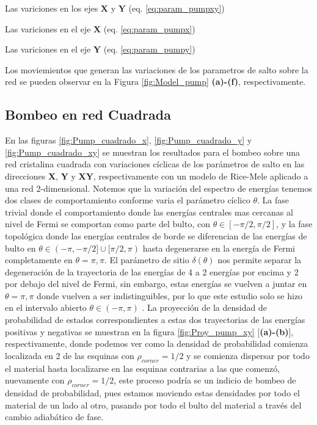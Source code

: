 Las variciones en los ejes $\mathbf{X}$ y $\mathbf{Y}$ (eq. \ref{eq:param_pumpxy})


Las variciones en el eje $\mathbf{X}$ (eq. \ref{eq:param_pumpx})


Las variciones en el eje $\mathbf{Y}$ (eq. \ref{eq:param_pumpy})

Los moviemientos que generan las variaciones de los parametros de salto sobre la red se pueden observar en la Figura \ref{fig:Model_pump} \textbf{(a)-(f)}, respectivamente.



\clearpage

\subsection{Bombeo en red Cuadrada}

En las figuras \ref{fig:Pump_cuadrado_x}, \ref{fig:Pump_cuadrado_y} y \ref{fig:Pump_cuadrado_xy} se muestran los resultados para el bombeo sobre una red cristalina cuadrada con variaciones cíclicas de los parámetros de salto en las direcciones \textbf{X}, \textbf{Y} y \textbf{XY}, respectivamente con un modelo de Rice-Mele aplicado a una red 2-dimensional. Notemos que la variación del espectro de energías tenemos dos clases de comportamiento conforme varia el parámetro cíclico $\theta$. La fase trivial donde el comportamiento donde las energías centrales mas cercanas al nivel de Fermi se comportan como parte del bulto, con $\theta \in [-\pi/2, \pi/2]$, y la fase topológica donde las energías centrales de borde se diferencian de las energías de bulto en $\theta \in (-\pi,-\pi/2] \cup [\pi/2,\pi)$ hasta degenerarse en la energía de Fermi completamente en $\theta = \pi,\pi$. El parámetro de sitio $\delta(\theta)$ nos permite separar la degeneración de la trayectoria de las energías de 4 a 2 energías por encima y 2 por debajo del nivel de Fermi, sin embargo, estas energías se vuelven a juntar en $\theta = \pi,\pi$ donde vuelven a ser indistinguibles, por lo que este estudio solo se hizo en el intervalo abierto $\theta \in (-\pi,\pi)$ . 
La proyección de la densidad de probabilidad de estados correspondientes a estas dos trayectorias de las energías positivas y negativas se muestran en la figura \ref{fig:Proy_pump_xy} [\textbf{(a)-(b)}], respectivamente, donde podemos ver como la densidad de probabilidad comienza localizada en 2 de las esquinas con $\rho_{corner} = 1/2$ y se comienza dispersar por todo el material hasta localizarse en las esquinas contrarias a las que comenzó, nuevamente con $\rho_{corner} = 1/2$, este proceso podría se un indicio de bombeo de densidad de probabilidad, pues estamos moviendo estas densidades por todo el material de un lado al otro, pasando por todo el bulto del material a través del cambio adiabático de fase. 

